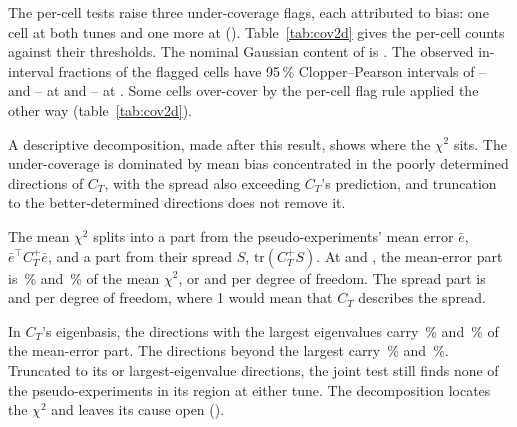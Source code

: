 The per-cell tests raise three under-coverage flags, each attributed to bias: one cell at both tunes and one more at  (). Table~\ref{tab:cov2d} gives the per-cell counts against their thresholds. The nominal Gaussian content of  is . The observed in-interval fractions of the flagged cells have 95\,\% Clopper--Pearson intervals of -- and -- at  and -- at .
Some cells over-cover by the per-cell flag rule applied the other way (table~\ref{tab:cov2d}).

A descriptive decomposition, made after this result, shows where the $\chi^2$ sits. The under-coverage is dominated by mean bias concentrated in the poorly determined directions of $C_T$, with the spread also exceeding $C_T$'s prediction, and truncation to the better-determined directions does not remove it.

The mean $\chi^2$ splits into a part from the pseudo-experiments' mean error $\bar e$, $\bar e^{\top}C_T^{+}\bar e$, and a part from their spread $S$, $\mathrm{tr}(C_T^{+}S)$. At  and , the mean-error part is \,\% and \,\% of the mean $\chi^2$, or  and  per degree of freedom. The spread part is  and  per degree of freedom, where 1 would mean that $C_T$ describes the spread.

In $C_T$'s eigenbasis, the  directions with the largest eigenvalues carry \,\% and \,\% of the mean-error part. The directions beyond the  largest carry \,\% and \,\%. Truncated to its  or  largest-eigenvalue directions, the joint test still finds none of the  pseudo-experiments in its region at either tune. The decomposition locates the $\chi^2$ and leaves its cause open ().

